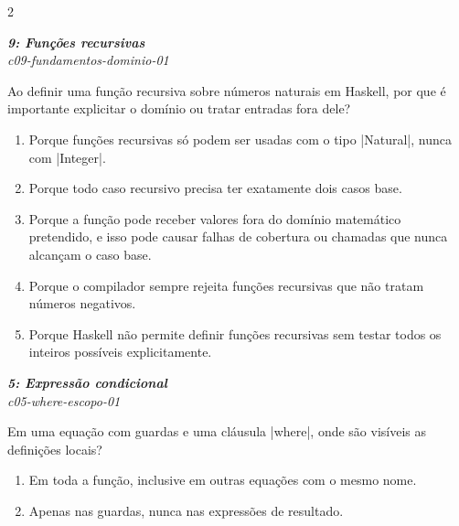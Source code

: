 \documentclass[a4paper,10pt,brazil]{article}
\begin{document}
\begin{multicols}{2}
\begin{enumerate}
\end{enumerate}

\begin{flushright}
  \footnotesize
  \textit{\textbf{9: Funções recursivas}}\\
  \textit{c09-fundamentos-dominio-01}\\

\end{flushright}
Ao definir uma função recursiva sobre números naturais em Haskell, por que é importante explicitar o domínio ou tratar entradas fora dele?

\begin{enumerate}
  \item Porque funções recursivas só podem ser usadas com o tipo \haskellinline|Natural|, nunca com \haskellinline|Integer|.

  \item Porque todo caso recursivo precisa ter exatamente dois casos base.

  \item Porque a função pode receber valores fora do domínio matemático pretendido, e isso pode causar falhas de cobertura ou chamadas que nunca alcançam o caso base.

  \item Porque o compilador sempre rejeita funções recursivas que não tratam números negativos.

  \item Porque Haskell não permite definir funções recursivas sem testar todos os inteiros possíveis explicitamente.


\end{enumerate}

\begin{flushright}
  \footnotesize
  \textit{\textbf{5: Expressão condicional}}\\
  \textit{c05-where-escopo-01}\\

\end{flushright}
Em uma equação com guardas e uma cláusula \haskellinline|where|, onde são visíveis as definições locais?

\begin{enumerate}
  \item Em toda a função, inclusive em outras equações com o mesmo nome.

  \item Apenas nas guardas, nunca nas expressões de resultado.


\end{enumerate}
\end{multicols}
\end{document}
